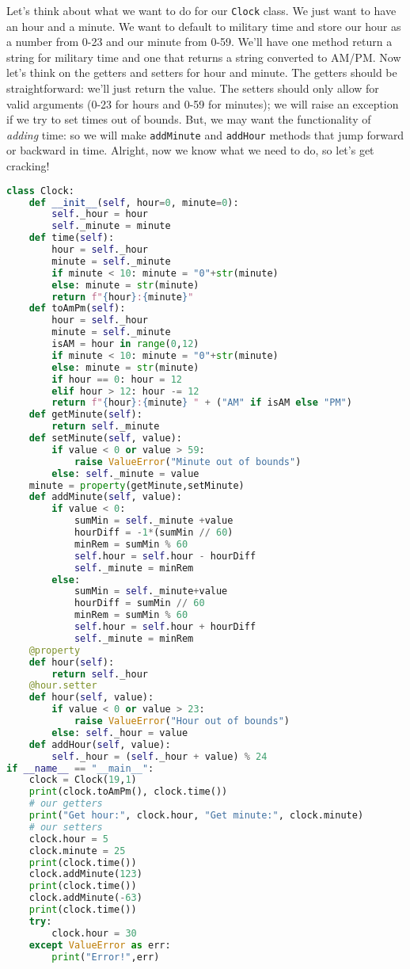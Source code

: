 \documentclass[11pt, twoside, reqno]{book}
\begin{document}
Let's think about what we want to do for our \texttt{Clock} class. We just want to have an hour and a minute. We want to default to military time and store our hour as a number from 0-23 and our minute from 0-59. We'll have one method return a string for military time and one that returns a string converted to AM/PM. Now let's think on the getters and setters for hour and minute. The getters should be straightforward: we'll just return the value. The setters should only allow for valid arguments (0-23 for hours and 0-59 for minutes); we will raise an exception if we try to set times out of bounds. But, we may want the functionality of \textit{adding} time: so we will make \texttt{addMinute} and \texttt{addHour} methods that jump forward or backward in time. Alright, now we know what we need to do, so let's get cracking!
\begin{lstlisting}[language=Python]
class Clock:
    def __init__(self, hour=0, minute=0):
        self._hour = hour
        self._minute = minute
    def time(self):
        hour = self._hour
        minute = self._minute
        if minute < 10: minute = "0"+str(minute)
        else: minute = str(minute)
        return f"{hour}:{minute}"
    def toAmPm(self):
        hour = self._hour
        minute = self._minute
        isAM = hour in range(0,12)
        if minute < 10: minute = "0"+str(minute)
        else: minute = str(minute)
        if hour == 0: hour = 12
        elif hour > 12: hour -= 12
        return f"{hour}:{minute} " + ("AM" if isAM else "PM")
    def getMinute(self):
        return self._minute
    def setMinute(self, value):
        if value < 0 or value > 59:
            raise ValueError("Minute out of bounds")
        else: self._minute = value
    minute = property(getMinute,setMinute)
    def addMinute(self, value):
        if value < 0:
            sumMin = self._minute +value
            hourDiff = -1*(sumMin // 60)
            minRem = sumMin % 60
            self.hour = self.hour - hourDiff
            self._minute = minRem
        else:
            sumMin = self._minute+value
            hourDiff = sumMin // 60
            minRem = sumMin % 60
            self.hour = self.hour + hourDiff
            self._minute = minRem
    @property
    def hour(self):
        return self._hour
    @hour.setter
    def hour(self, value):
        if value < 0 or value > 23:
            raise ValueError("Hour out of bounds")           
        else: self._hour = value
    def addHour(self, value):
        self._hour = (self._hour + value) % 24
if __name__ == "__main__":
    clock = Clock(19,1)
    print(clock.toAmPm(), clock.time())
    # our getters
    print("Get hour:", clock.hour, "Get minute:", clock.minute)
    # our setters
    clock.hour = 5
    clock.minute = 25
    print(clock.time())
    clock.addMinute(123)
    print(clock.time())
    clock.addMinute(-63)
    print(clock.time())
    try:
        clock.hour = 30
    except ValueError as err:
        print("Error!",err)
\end{lstlisting}
\end{document}
